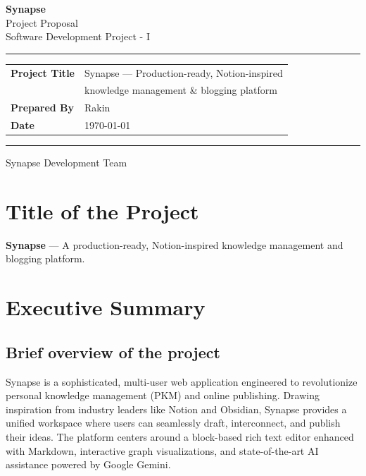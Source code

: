 \documentclass[12pt, a4paper]{article}
\begin{document}
\begin{titlepage}
  \centering
  \vspace*{2cm}

  {\Huge\bfseries\color{primary} Synapse}\\[0.4em]
  {\Large\color{muted} Project Proposal}\\[0.2em]
  {\normalsize\color{muted} Software Development Project - I}

  \vspace{1.5cm}
  \rule{0.6\linewidth}{1.5pt}
  \vspace{1cm}

  \begin{tabular}{@{}ll@{}}
    \textbf{Project Title} & Synapse — Production-ready, Notion-inspired \\
                           & knowledge management \& blogging platform \\[4pt]
    \textbf{Prepared By}   & Rakin \\[4pt]
    \textbf{Date}          & \today \\[4pt]
  \end{tabular}

  \vspace{2cm}
  \rule{0.6\linewidth}{0.8pt}
  \vspace{0.5cm}

  {\small\color{muted}
    Synapse Development Team
  }

\end{titlepage}

\tableofcontents
\newpage

\section{Title of the Project}
\textbf{Synapse} --- A production-ready, Notion-inspired knowledge management and blogging platform.

\section{Executive Summary}

\subsection{Brief overview of the project}
Synapse is a sophisticated, multi-user web application engineered to revolutionize personal knowledge management (PKM) and online publishing. Drawing inspiration from industry leaders like Notion and Obsidian, Synapse provides a unified workspace where users can seamlessly draft, interconnect, and publish their ideas. The platform centers around a block-based rich text editor enhanced with Markdown, interactive graph visualizations, and state-of-the-art AI assistance powered by Google Gemini.
\end{document}
